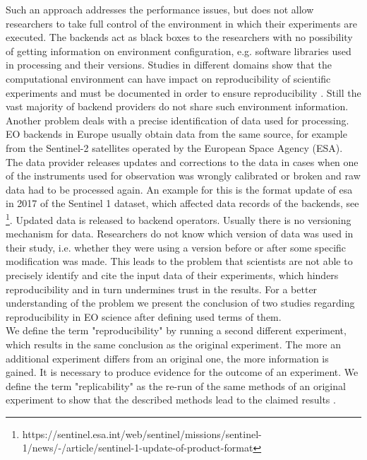 \documentclass[draft,final]{vutinfth} %
\begin{document}
Such an approach addresses the performance issues, but does not allow researchers to take full control of the environment in which their experiments are executed. The backends act as black boxes to the researchers with no possibility of getting information on environment configuration, e.g. software libraries used in processing and their versions. Studies in different domains show that the computational environment can have impact on reproducibility of scientific experiments and must be documented in order to ensure reproducibility \cite{Freesurfer} \cite{Thestateofreproducibility}  \cite{MiksaBiomedical}. Still the vast majority of backend providers do not share such environment information. Another problem deals with a precise identification of data used for processing. EO backends in Europe usually obtain data from the same source, for example from the Sentinel-2 satellites operated by the European Space Agency (ESA). The data provider releases updates and corrections to the data in cases when one of the instruments used for observation was wrongly calibrated or broken and raw data had to be processed again. An example for this is the format update of \gls{esa} in 2017 of the Sentinel 1 dataset, which affected data records of the backends, see \footnote{https://sentinel.esa.int/web/sentinel/missions/sentinel-1/news/-/article/sentinel-1-update-of-product-format}. Updated data is released to backend operators. Usually there is no versioning mechanism for data. Researchers do not know which version of data was used in their study, i.e. whether they were using a version before or after some specific modification was made. This leads to the problem that scientists are not able to precisely identify and cite the input data of their experiments, which hinders reproducibility and in turn undermines trust in the results. For a better understanding of the problem we present the conclusion of two studies regarding reproducibility in EO science after defining used terms of them. \\
We define the term "reproducibility" by running a second different experiment, which results in the same conclusion as the original experiment. The more an additional experiment differs from an original one, the more information is gained. It is necessary to produce evidence for the outcome of an experiment. We define the term "replicability" as the re-run of the same methods of an original experiment to show that the described methods lead to the claimed results \cite{reprovsrepli}. \\
\end{document}
